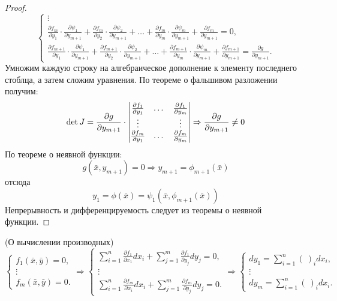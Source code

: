 \begin{proof}
\[\begin{cases}
        \vdots\\
        \frac{\partial {f_m}}{\partial {y_1}}\cdot \frac{\partial {\psi_1}}{\partial {y_{m+1}}}+\frac{\partial {f_m}}{\partial {y_2}}\cdot \frac{\partial {\psi_2}}{\partial {y_{m+1}}}+ \dots +\frac{\partial {f_m}}{\partial {y_m}}\cdot \frac{\partial {\psi_m}}{\partial {y_{m+1}}}+\frac{\partial {f_m}}{\partial {y_{m+1}}}=0,\\
        \frac{\partial {f_{m+1}}}{\partial {y_1}}\cdot \frac{\partial {\psi_1}}{\partial {y_{m+1}}}+\frac{\partial {f_{m+1}}}{\partial {y_2}}\cdot \frac{\partial {\psi_2}}{\partial {y_{m+1}}}+ \dots +\frac{\partial {f_{m+1}}}{\partial {y_m}}\cdot \frac{\partial {\psi_m}}{\partial {y_{m+1}}}+\frac{\partial {f_{m+1}}}{\partial {y_{m+1}}}=\frac{\partial {g}}{\partial {y_{m+1}}}.
    \end{cases}
    \]
    Умножим каждую строку на алгебраическое дополнение к элементу последнего стоблца, а затем сложим уравнения. По теореме о фальшивом разложении получим:
    \[\det{J}=\frac{\partial {g}}{\partial {y_{m+1}}}\cdot \begin{vmatrix}
        \frac{\partial {f_1}}{\partial {y_1}} & \dots & \frac{\partial {f_1}}{\partial {y_m}}\\
        \vdots & \null & \vdots\\
        \frac{\partial {f_m}}{\partial {y_1}} & \dots & \frac{\partial {f_m}}{\partial {y_m}}
    \end{vmatrix} \Rightarrow \frac{\partial {g}}{\partial {y_{m+1}}}\ne 0
    \]
    По теореме о неявной функции:
    \[g(\bar{x}, y_{m+1})=0 \Rightarrow y_{m+1}=\phi_{m+1}(\bar{x})\]
    отсюда
    \[y_1=\phi(\bar{x})=\psi_1(\bar{x}, \phi_{m+1}(\bar{x}))\]
    Непрерывность и дифференцируемость следует из теоремы о неявной функции.
\end{proof} 
\begin{comm} (О вычислении производных)\\
    \[\begin{cases}
        f_1(\bar{x}, \bar{y})=0,\\
        \vdots\\
        f_m(\bar{x}, \bar{y})=0.
    \end{cases}
    \Rightarrow
    \begin{cases}
        \sum\limits_{i=1}^{n}\frac{\partial {f_1}}{\partial {x_1}}dx_i+\sum\limits_{j=1}^{m}\frac{\partial {f_1}}{\partial {y_j}}dy_j=0,\\
        \vdots\\
        \sum\limits_{i=1}^{n}\frac{\partial {f_m}}{\partial {x_i}}dx_i+\sum\limits_{j=1}^{m}\frac{\partial {f_m}}{\partial {y_j}}dy_j=0.
    \end{cases}
    \Rightarrow
    \begin{cases}
        dy_1=\sum\limits_{i=1}^{n}(\ )_i dx_i,\\
        \vdots\\
        dy_m=\sum\limits_{i=1}^{n}(\ )_i dx_i.
    \end{cases}
    \]
\end{comm} 
